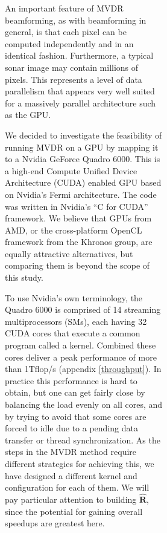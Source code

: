\documentclass[12pt,journal,draftclsnofoot,onecolumn]{IEEEtran}
\newcommand\mat[1]{\boldsymbol{#1}}
\newcommand\1{\vec 1}
\newcommand*\eR{\mat{\hat R}}
\begin{document}
\begin{figure}[H]
\begin{figure}[!t]
\begin{figure}[!t]

An important feature of MVDR beamforming, as with beamforming in general, is that each pixel can be computed independently and in an identical fashion. Furthermore, a typical sonar image may contain millions of pixels. This represents a level of data parallelism that appears very well suited for a massively parallel architecture such as the GPU.

We decided to investigate the feasibility of running MVDR on a GPU by mapping it to a Nvidia GeForce Quadro 6000. This is a high-end Compute Unified Device Architecture (CUDA) enabled GPU based on Nvidia's Fermi architecture. The code was written in Nvidia's ``C for CUDA'' framework. We believe that GPUs from AMD, or the cross-platform OpenCL framework from the Khronos group, are equally attractive alternatives, but comparing them is beyond the scope of this study.

To use Nvidia's own terminology, the Quadro 6000 is comprised of 14 streaming multiprocessors (SMs), each having 32 CUDA cores that execute a common program called a kernel. Combined these cores deliver a peak performance of more than 1\;Tflop/s (appendix \ref{throughput}). In practice this performance is hard to obtain, but one can get fairly close by balancing the load evenly on all cores, and by trying to avoid that some cores are forced to idle due to a pending data transfer or thread synchronization. As the steps in the MVDR method require different strategies for achieving this, we have designed a different kernel and configuration for each of them. We will pay particular attention to building $\eR$, since the potential for gaining overall speedups are greatest here.



\end{figure}
\end{figure}
\end{figure}
\end{document}
